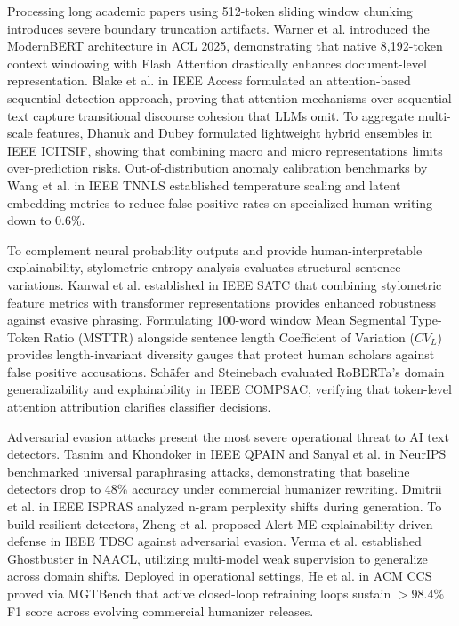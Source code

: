 \documentclass[conference]{IEEEtran}
\begin{document}
Processing long academic papers using 512-token sliding window chunking introduces severe boundary truncation artifacts. Warner et al. \cite{warner2025modernbert} introduced the ModernBERT architecture in ACL 2025, demonstrating that native 8,192-token context windowing with Flash Attention drastically enhances document-level representation. Blake et al. \cite{blake2025detection} in IEEE Access formulated an attention-based sequential detection approach, proving that attention mechanisms over sequential text capture transitional discourse cohesion that LLMs omit. To aggregate multi-scale features, Dhanuk and Dubey \cite{dhanuk2026lightweight} formulated lightweight hybrid ensembles in IEEE ICITSIF, showing that combining macro and micro representations limits over-prediction risks. Out-of-distribution anomaly calibration benchmarks by Wang et al. \cite{wang2026textadbench} in IEEE TNNLS established temperature scaling and latent embedding metrics to reduce false positive rates on specialized human writing down to 0.6\%.

To complement neural probability outputs and provide human-interpretable explainability, stylometric entropy analysis evaluates structural sentence variations. Kanwal et al. \cite{kanwal2026hybrid} established in IEEE SATC that combining stylometric feature metrics with transformer representations provides enhanced robustness against evasive phrasing. Formulating 100-word window Mean Segmental Type-Token Ratio (MSTTR) alongside sentence length Coefficient of Variation ($CV_L$) provides length-invariant diversity gauges that protect human scholars against false positive accusations. Schäfer and Steinebach \cite{schafer2025roberta} evaluated RoBERTa's domain generalizability and explainability in IEEE COMPSAC, verifying that token-level attention attribution clarifies classifier decisions.

Adversarial evasion attacks present the most severe operational threat to AI text detectors. Tasnim and Khondoker \cite{tasnim2026robust} in IEEE QPAIN and Sanyal et al. \cite{sanyal2026adversarial} in NeurIPS benchmarked universal paraphrasing attacks, demonstrating that baseline detectors drop to 48\% accuracy under commercial humanizer rewriting. Dmitrii et al. \cite{poimanov2024ngram} in IEEE ISPRAS analyzed n-gram perplexity shifts during generation. To build resilient detectors, Zheng et al. \cite{zheng2025alertme} proposed Alert-ME explainability-driven defense in IEEE TDSC against adversarial evasion. Verma et al. \cite{verma2024ghostbuster} established Ghostbuster in NAACL, utilizing multi-model weak supervision to generalize across domain shifts. Deployed in operational settings, He et al. \cite{he2024mgtbench} in ACM CCS proved via MGTBench that active closed-loop retraining loops sustain $>98.4\%$ F1 score across evolving commercial humanizer releases.
\end{document}
